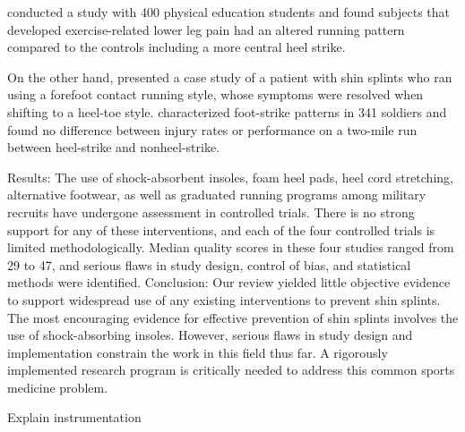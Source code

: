 \citet{willems2004intrinsic} conducted a study with 400 physical education students and found subjects that developed exercise-related lower leg pain had an altered running pattern compared to the controls including a more central heel strike. 

On the other hand, \citet{cibulka1994shin} presented a case study of a patient with shin splints who ran using a forefoot contact running style, whose symptoms were resolved when shifting to a heel-toe style. \citet{warr2015characterization} characterized foot-strike patterns in 341 soldiers and found no difference between injury rates or performance on a two-mile run between heel-strike and nonheel-strike. 

\citep{thacker2002prevention} Results: The use of shock-absorbent insoles,
foam heel pads, heel cord stretching, alternative footwear, as well as graduated running programs among military recruits have
undergone assessment in controlled trials. There is no strong support for any of these interventions, and each of the four controlled trials
is limited methodologically. Median quality scores in these four studies ranged from 29 to 47, and serious flaws in study design, control
of bias, and statistical methods were identified. Conclusion: Our review yielded little objective evidence to support widespread use
of any existing interventions to prevent shin splints. The most encouraging evidence for effective prevention of shin splints involves
the use of shock-absorbing insoles. However, serious flaws in study design and implementation constrain the work in this field thus
far. A rigorously implemented research program is critically needed to address this common sports medicine problem.

Explain instrumentation 




